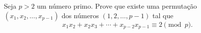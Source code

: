 Seja \(p>2\) um número primo. Prove que existe uma permutação \((x_1,x_2,\ldots,x_{p-1})\) dos números \((1,2,\ldots,p-1)\) tal que
\[
x_1x_2 + x_2x_3 + \cdots + x_{p-2}x_{p-1} \equiv 2 \pmod p.
\]
